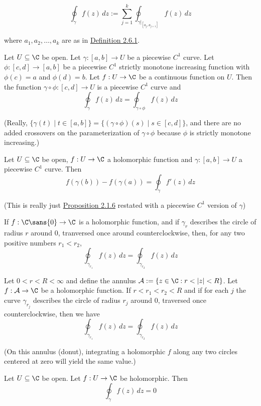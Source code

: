 $$
  \oint_\gamma f(z)\,dz:=\sum_{j=1}^k\oint_{\gamma|_{[a_j,a_{j+1}]}}
  f(z)\,dz
$$

where $a_1,a_2,\ldots,a_k$ are as in \href{baf22ac}{Definition 2.6.1}.

\label{b6b6d51}

Let $U\subseteq\C$ be open. Let $\gamma:[a,b]\to U$ be a piecewise $C^1$ curve.
Let $\phi:[c,d]\to[a,b]$ be a piecewise $C^1$ strictly monotone increasing
function with $\phi(c)=a$ and $\phi(d)=b$. Let $f:U\to\C$ be a continuous
function on $U$. Then the function $\gamma\circ\phi:[c,d]\to U$ is a piecewise
$C^1$ curve and
$$\oint_\gamma f(z)\,dz=\oint_{\gamma\circ\phi}f(z)\,dz$$

(Really, $\{\gamma(t)\mid t\in[a,b]\}=\{(\gamma\circ\phi)(s)\mid s
\in[c,d]\}$, and there are no added crossovers on the parameterization
of $\gamma\circ\phi$ because $\phi$ is strictly monotone increasing.)

\label{cd28a8f}

Let $U\subseteq\C$ be open, $f:U\to\C$ a holomorphic function and
$\gamma:[a,b]\to U$ a piecewise $C^1$ curve. Then
$$
  f(\gamma(b))-f(\gamma(a))=\oint_\gamma f'(z)\,dz
$$

(This is really just \href{c526c09}{Proposition 2.1.6} restated
with a piecewise $C^1$ version of $\gamma$)

\label{b52bca5}

If $f:\C\sans{0}\to\C$ is a holomorphic function, and if $\gamma_r$ describes
the circle of radius $r$ around $0$, tranversed once around counterclockwise,
then, for any two positive numbers $r_1<r_2$,
$$
  \oint_{\gamma_{r_1}}f(z)\,dz=\oint_{\gamma_{r_2}}f(z)\,dz
$$

\label{ecbc559}

Let $0<r<R<\infty$ and define the annulus $\mathcal A:=\{z\in\C:r<|z|<R\}$. Let
$f:\mathcal A\to\C$ be a holomorphic function. If $r<r_1<r_2<R$ and if for each
$j$ the curve $\gamma_{r_j}$ describes the circle of radius $r_j$ around 0,
traversed once counterclockwise, then we have
$$
  \oint_{\gamma_{r_1}}f(z)\,dz=\oint_{\gamma_{r_2}}f(z)\,dz
$$

(On this annulus (donut), integrating a holomorphic $f$ along any two
circles centered at zero will yield the same value.)

\label{be5c80c}

Let $U\subseteq\C$ be open. Let $f:U\to\C$ be holomorphic. Then
$$\oint_\gamma f(z)\,dz=0$$

